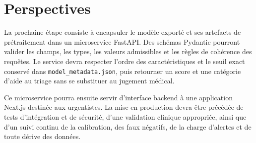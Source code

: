 \section*{Perspectives}
La prochaine étape consiste à encapsuler le modèle exporté et ses artefacts de prétraitement dans un microservice FastAPI. Des schémas Pydantic pourront valider les champs, les types, les valeurs admissibles et les règles de cohérence des requêtes. Le service devra respecter l'ordre des caractéristiques et le seuil exact conservé dans \texttt{model\_metadata.json}, puis retourner un score et une catégorie d'aide au triage sans se substituer au jugement médical.

Ce microservice pourra ensuite servir d'interface backend à une application Next.js destinée aux urgentistes. La mise en production devra être précédée de tests d'intégration et de sécurité, d'une validation clinique appropriée, ainsi que d'un suivi continu de la calibration, des faux négatifs, de la charge d'alertes et de toute dérive des données.
